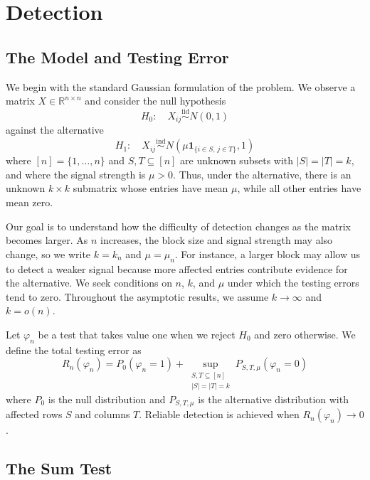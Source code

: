 \documentclass[12pt]{article}
\begin{document}
\clearpage
\section{Detection}\label{sec:detection}

\subsection{The Model and Testing Error}

We begin with the standard Gaussian formulation of the problem. We observe
a matrix $X\in\mathbb R^{n\times n}$ and consider the null hypothesis
\[
H_0:\quad X_{ij}\overset{\mathrm{iid}}{\sim}N(0,1)
\]
against the alternative
\[
H_1:\quad X_{ij}\overset{\mathrm{ind}}{\sim}
N\left(\mu\mathbf{1}_{\{i\in S,\,j\in T\}},1\right)
\]
where $[n]=\{1,\ldots,n\}$ and $S,T\subseteq[n]$ are unknown subsets
with $|S|=|T|=k$, and where the signal strength is $\mu>0$. Thus, under the alternative, there is an unknown $k\times k$
submatrix whose entries have mean $\mu$, while all other entries have
mean zero. 

Our goal is to understand how the difficulty of detection changes as the
matrix becomes larger. As $n$ increases, the block size and signal
strength may also change, so we write $k=k_n$ and $\mu=\mu_n$. For
instance, a larger block may allow us to detect a weaker signal because
more affected entries contribute evidence for the alternative. We seek
conditions on $n$, $k$, and $\mu$ under which the testing errors tend to
zero. Throughout the asymptotic results, we assume $k\to\infty$ and
$k=o(n)$.

Let $\varphi_n$ be a test that takes value one when we
reject $H_0$ and zero otherwise. We define the total testing error as
\[
R_n(\varphi_n)
=P_0(\varphi_n=1)
+\sup_{\substack{S,T\subseteq[n]\\|S|=|T|=k}}
P_{S,T,\mu}(\varphi_n=0)
\]
where $P_0$ is the null distribution and $P_{S,T,\mu}$ is the
alternative distribution with affected rows $S$ and columns $T$.
Reliable detection is achieved when $R_n(\varphi_n)\to0$.

\subsection{The Sum Test}
\end{document}
